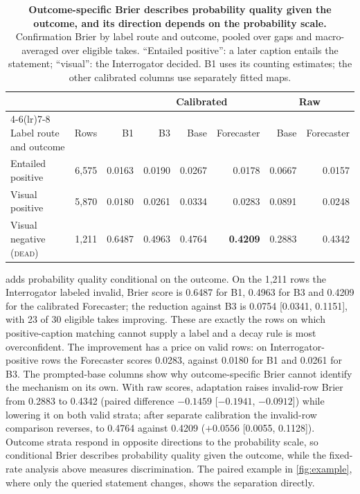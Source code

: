 \documentclass[10pt]{article}
\newcommand{\dead}{\textsc{dead}}
\begin{document}
\begin{table}[t]
\centering
\caption{\textbf{Outcome-specific Brier describes probability quality given the outcome, and its direction depends on the probability scale.} Confirmation Brier by label route and outcome, pooled over gaps and macro-averaged over eligible takes. ``Entailed positive'': a later caption entails the statement; ``visual'': the Interrogator decided. B1 uses its counting estimates; the other calibrated columns use separately fitted maps.}
\label{tab:route}
\small
\begin{tabular}{lrrrrrrr}
\toprule
& & & \multicolumn{3}{c}{Calibrated} & \multicolumn{2}{c}{Raw} \\
\cmidrule(lr){4-6}\cmidrule(lr){7-8}
Label route and outcome & Rows & B1 & B3 & Base & Forecaster & Base & Forecaster \\
\midrule
Entailed positive & 6,575 & 0.0163 & 0.0190 & 0.0267 & 0.0178 & 0.0667 & 0.0157 \\
Visual positive & 5,870 & 0.0180 & 0.0261 & 0.0334 & 0.0283 & 0.0891 & 0.0248 \\
Visual negative (\dead{}) & 1,211 & 0.6487 & 0.4963 & 0.4764 & \textbf{0.4209} & 0.2883 & 0.4342 \\
\bottomrule
\end{tabular}
\end{table}

 adds probability quality conditional on the outcome. On the 1,211 rows the Interrogator labeled invalid, Brier score is 0.6487 for B1, 0.4963 for B3 and 0.4209 for the calibrated Forecaster; the reduction against B3 is 0.0754 [0.0341, 0.1151], with 23 of 30 eligible takes improving. These are exactly the rows on which positive-caption matching cannot supply a label and a decay rule is most overconfident. The improvement has a price on valid rows: on Interrogator-positive rows the Forecaster scores 0.0283, against 0.0180 for B1 and 0.0261 for B3. The prompted-base columns show why outcome-specific Brier cannot identify the mechanism on its own. With raw scores, adaptation raises invalid-row Brier from 0.2883 to 0.4342 (paired difference $-0.1459$ [$-0.1941$, $-0.0912$]) while lowering it on both valid strata; after separate calibration the invalid-row comparison reverses, to 0.4764 against 0.4209 ($+0.0556$ [0.0055, 0.1128]). Outcome strata respond in opposite directions to the probability scale, so conditional Brier describes probability quality given the outcome, while the fixed-rate analysis above measures discrimination. The paired example in \cref{fig:example}, where only the queried statement changes, shows the separation directly.
\end{document}
